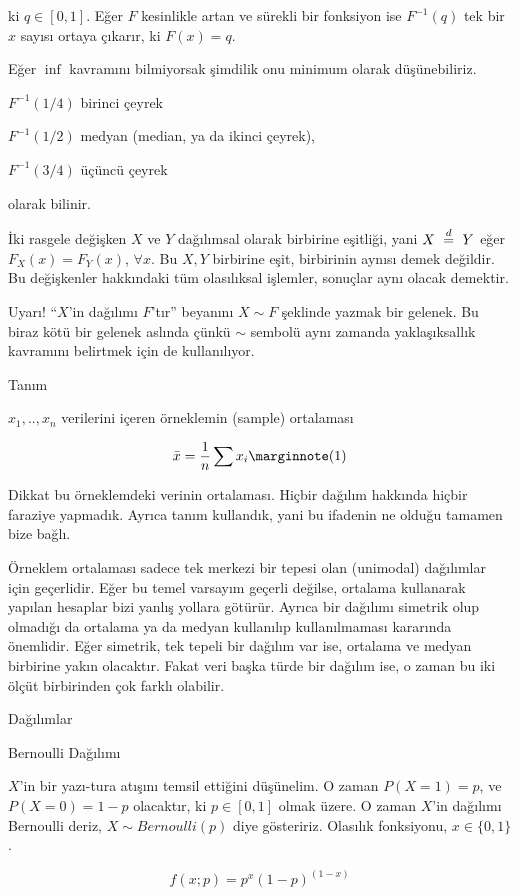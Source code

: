 \documentclass[12pt,fleqn]{article}\usepackage{../../common}
\begin{document}
ki $q \in [0,1]$. Eğer $F$ kesinlikle artan ve sürekli bir fonksiyon ise
$F^{-1}(q)$ tek bir $x$ sayısı ortaya çıkarır, ki $F(x) = q$. 

Eğer $\inf$ kavramını bilmiyorsak şimdilik onu minimum olarak düşünebiliriz. 

$F^{-1}(1/4)$ birinci çeyrek

$F^{-1}(1/2)$ medyan (median, ya da ikinci çeyrek), 

$F^{-1}(3/4)$ üçüncü çeyrek 

olarak bilinir. 

İki rasgele değişken $X$ ve $Y$ dağılımsal olarak birbirine eşitliği, yani
$X \ \buildrel d \over = \ Y$ eğer $F_X(x) = F_Y(x)$, $\forall x$. Bu $X,Y$ birbirine eşit, birbirinin 
aynısı demek değildir. Bu değişkenler hakkındaki tüm olasılıksal işlemler, 
sonuçlar aynı olacak demektir.

Uyarı! ``$X$'in dağılımı $F$'tır'' beyanını $X \sim F$ şeklinde yazmak bir
gelenek. Bu biraz kötü bir gelenek aslında çünkü $\sim$ sembolü aynı
zamanda yaklaşıksallık kavramını belirtmek için de kullanılıyor.


Tanım

$x_1,..,x_n$ verilerini içeren örneklemin (sample) ortalaması 

$$ \bar{x} = \frac{1}{n} \sum x_i
\mlabel{1}
$$

Dikkat bu örneklemdeki verinin ortalaması. Hiçbir dağılım hakkında hiçbir
faraziye yapmadık. Ayrıca tanım kullandık, yani bu ifadenin ne olduğu
tamamen bize bağlı. 

Örneklem ortalaması sadece tek merkezi bir tepesi olan (unimodal)
dağılımlar için geçerlidir. Eğer bu temel varsayım geçerli değilse,
ortalama kullanarak yapılan hesaplar bizi yanlış yollara götürür. Ayrıca
bir dağılımı simetrik olup olmadığı da ortalama ya da medyan kullanılıp
kullanılmaması kararında önemlidir. Eğer simetrik, tek tepeli bir dağılım
var ise, ortalama ve medyan birbirine yakın olacaktır. Fakat veri başka
türde bir dağılım ise, o zaman bu iki ölçüt birbirinden çok farklı
olabilir.

Dağılımlar

Bernoulli Dağılımı

$X$'in bir yazı-tura atışını temsil ettiğini düşünelim. O zaman $P(X = 1) =p$, 
ve $P(X = 0) = 1 - p$ olacaktır, ki $p \in [0,1]$ olmak üzere. O zaman
$X$'in dağılımı Bernoulli deriz, $X \sim Bernoulli(p)$ diye
gösteririz. Olasılık fonksiyonu, $x \in \{0,1\}$.

$$ f(x;p) = p^x(1-p)^{(1-x)} $$
\end{document}
